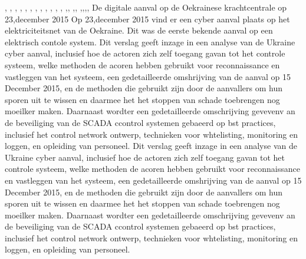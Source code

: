 \cite{kingskey19042022tjernobyl},
\cite{erikbork26042023reactor4},
\cite{nosTjernobyl30jaarlater},
\cite{knmi04052021tjernobylbosbrand},
\cite{dodonovaKVIRisicoTjernobyl},
\cite{dumarey04062020verhaalTjernobylWaarheid},
\cite{sparkesNewScientistTjernoby},
\cite{kernenergiened26041986chronologiemaatregelen},
\cite{mapszoneReactor},
\cite{kernhistoriek15062021tjernobyl},
\cite{nucleairforumFeitenTjernobyl},
\cite{kernongevalTjernobylFancGov},
\cite{arendswolters062019lessenTjernobyl},\cite{damveld08052020tjernobyl},
\cite{deVriestjernobylHolland},\cite{ing3enieur29042015antistralingskoepel},
\cite{verschuur14012013tjernobylreports},\cite{paperlessarchivesTjernobyl},\cite{vargos082000tjernobylconcerns},\cite{mauroNuclearRiskSociety},\cite{vienna06092005LookingBack}
\newline \indent  De digitale aanval op de Oekrainese krachtcentrale op 23,december 2015
Op 23,december 2015  vind er een cyber aanval plaats op het elektriciteitsnet van de Oekraine. Dit was de eerste bekende aanval op een elektrisch contole  system.  Dit verslag geeft inzage in een analyse van de Ukraine cyber aanval,
inclusief hoe de actoren zich zelf toegang gavan tot het controle systeem, welke methoden de acoren hebben gebruikt voor reconnaissance en vastleggen van het systeem, een gedetailleerde omshrijving van de aanval op 15 December 2015, en de methoden die gebruikt zijn door de aanvallers om hun sporen uit te wissen en daarmee het het stoppen van schade toebrengen  nog moeilker maken. Daarnaast wordter  een gedetailleerde omschrijving gevevenv an de beveiliging van de SCADA ccontrol systemen gebaeerd op bst practices, inclusief het control network ontwerp, technieken voor whtelisting, monitoring en loggen, en  opleiding van personeel.
\cite{Whitehead2017ukrainepoweroutage}
\cite{noauthor_2022-nm}
\cite{zetter2016GridHack}
\cite{owens21032017ukrainemitigationstrategies}
\cite{cerulus2019FrontlineRussiaAttack}
\cite{grammatikis2019AttackIEC6087505104}
\cite{hidajat2016ScadaSimulator}
\cite{uscert20072021crashmalware}
\cite{zetter12062017malwareanalysis}
\cite{icsRussianHackingCyberWeapon}
\cite{usgovC2M2}
Dit verslag geeft inzage in een analyse van de Ukraine cyber aanval,
inclusief hoe de actoren zich zelf toegang gavan tot het controle systeem, welke methoden de acoren hebben gebruikt voor reconnaissance en vastleggen van het systeem, een gedetailleerde omshrijving van de aanval op 15 December 2015, en de methoden die gebruikt zijn door de aanvallers om hun sporen uit te wissen en daarmee het het stoppen van schade toebrengen  nog moeilker maken. Daarnaast wordter  een gedetailleerde omschrijving gevevenv an de beveiliging van de SCADA ccontrol systemen gebaeerd op bst practices, inclusief het control network ontwerp, technieken voor whtelisting, monitoring en loggen, en  opleiding van personeel.
